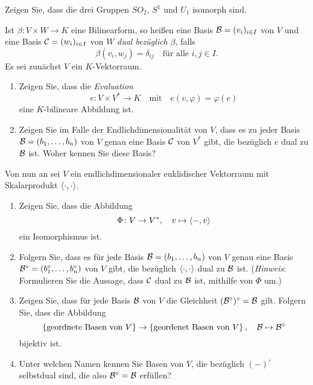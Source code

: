 \documentclass[a4paper,10pt]{scrartcl}
\begin{document}
\begin{question}
  Zeigen Sie, dass die drei Gruppen $SO_2$, $S^1$ und $U_1$ isomorph sind.
\end{question}














\begin{question}
  Ist $\beta \colon V \times W \to K$ eine Bilinearform, so heißen eine Basis $\mathcal{B} = (v_i)_{i \in I}$ von $V$ und eine Basis $\mathcal{C} = (w_i)_{i \in I}$ von $W$ \emph{dual bezüglich $\beta$}, falls
  \[
    \beta(v_i, w_j) = \delta_{ij}
    \quad
    \text{für alle $i, j \in I$}.
  \]
  Es sei zunächst $V$ ein $K$-Vektorraum.
  \begin{enumerate}
    \item
      Zeigen Sie, dass die \emph{Evaluation}
      \[
        e \colon V \times V^* \to K
        \quad\text{mit}\quad
        e(v, \varphi) = \varphi(e)
      \]
      eine $K$-bilineare Abbildung ist.
    \item
      Zeigen Sie im Falle der Endlichdimensionalität von $V$, dass es zu jeder Basis $\mathcal{B} = (b_1, \dotsc, b_n)$ von $V$ genau eine Basis $\mathcal{C}$ von $V^*$ gibt, die bezüglich $e$ dual zu $\mathcal{B}$ ist.
      Woher kennen Sie diese Basis?
  \end{enumerate}
  Von nun an sei $V$ ein endlichdimensionaler euklidischer Vektorraum mit Skalarprodukt $\langle \cdot, \cdot \rangle$.
  \begin{enumerate}[resume]
    \item
      Zeigen Sie, dass die Abbildung
      \[
        \Phi \colon V \to V^*,
        \quad
        v \mapsto \langle -, v \rangle
      \]
      ein Isomorphismus ist.
    \item
      Folgern Sie, dass es für jede Basis $\mathcal{B} = (b_1, \dotsc, b_n)$ von $V$ genau eine Basis $\mathcal{B}^\circ = (b_1^\circ, \dotsc, b_n^\circ)$ von $V$ gibt, die bezüglich $\langle \cdot, \cdot \rangle$ dual zu $\mathcal{B}$ ist.
      (\emph{Hinweis}: Formulieren Sie die Aussage, dass $\mathcal{C}$ dual zu $\mathcal{B}$ ist, mithilfe von $\Phi$ um.)
    \item
      Zeigen Sie, dass für jede Basis $\mathcal{B}$ von $V$ die Gleichheit $(\mathcal{B}^\circ)^\circ = \mathcal{B}$ gilt.
      Folgern Sie, dass die Abbildung
      \[
            \left\{ \text{geordnete Basen von $V$} \right\}
        \to \left\{ \text{geordenet Basen von $V$} \right\},
        \quad
        \mathcal{B} \mapsto \mathcal{B}^\circ
      \]
      bijektiv ist.
    \item
      Unter welchen Namen kennen Sie Basen von $V$, die bezüglich $(-)^\circ$ selbstdual sind, die also $\mathcal{B}^\circ = \mathcal{B}$ erfüllen?
  \end{enumerate}
\end{question}
\end{document}
